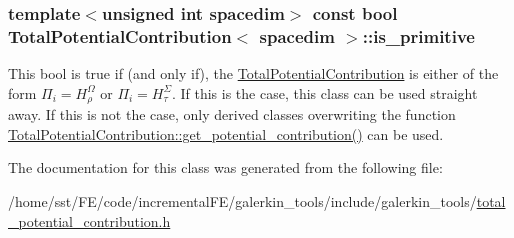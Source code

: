 \subsubsection[{\texorpdfstring{is\+\_\+primitive}{is_primitive}}]{\setlength{\rightskip}{0pt plus 5cm}template$<$unsigned int spacedim$>$ const bool {\bf Total\+Potential\+Contribution}$<$ spacedim $>$\+::is\+\_\+primitive}\hypertarget{class_total_potential_contribution_a45bfb25a7693c949c26e223cf4a1a1e7}{}\label{class_total_potential_contribution_a45bfb25a7693c949c26e223cf4a1a1e7}
This bool is {\ttfamily true} if (and only if), the \hyperlink{class_total_potential_contribution}{Total\+Potential\+Contribution} is either of the form $\Pi_i=H^\Omega_\rho$ or $\Pi_i=H^\Sigma_\tau$. If this is the case, this class can be used straight away. If this is not the case, only derived classes overwriting the function \hyperlink{class_total_potential_contribution_a0d281fceeb90ece5c4d2655df5eb9948}{Total\+Potential\+Contribution\+::get\+\_\+potential\+\_\+contribution()} can be used. 

The documentation for this class was generated from the following file\+:\begin{DoxyCompactItemize}
\item 
/home/sst/\+F\+E/code/incremental\+F\+E/galerkin\+\_\+tools/include/galerkin\+\_\+tools/\hyperlink{total__potential__contribution_8h}{total\+\_\+potential\+\_\+contribution.\+h}\end{DoxyCompactItemize}
